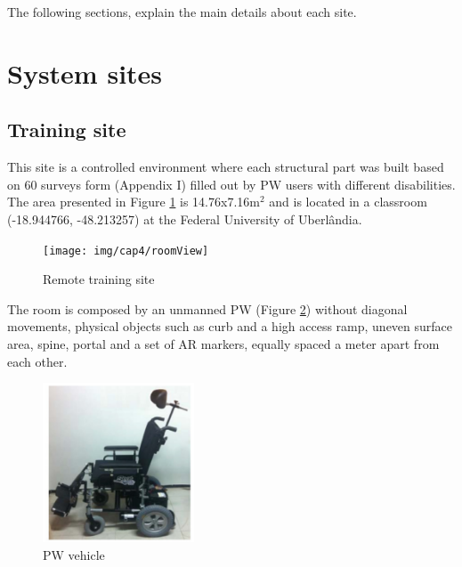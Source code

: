 The following sections, explain the main details about each site.

\section{System sites}

\subsection{Training site}

This site is a controlled environment where each structural part was built based on 60 surveys form (Appendix I) filled out by PW users with different disabilities. The area presented in Figure \ref{fig:roomView} is 14.76x7.16m$^{2}$ and is located in a classroom (-18.944766, -48.213257) at the Federal University of Uberlândia. 


\begin{figure}[!hbt]
\begin{center}
\texttt{[image: img/cap4/roomView]}
\caption{Remote training site} 
\label{fig:roomView} 
\end{center}
\vspace{-20pt}
\end{figure}


The room is composed by an unmanned PW (Figure \ref{fig:wheel-smbsm2}) without diagonal movements, physical objects such as curb and a high access ramp, uneven surface area, spine, portal and a set of AR markers,  equally spaced a meter apart from each other. 

\begin{figure}[!hbt]
\begin{center}
\includegraphics[width=0.4\textwidth]{img/cap4/wheel-smbsm2}
\caption{PW vehicle}
\label{fig:wheel-smbsm2}
\end{center}
\vspace{-20pt}
\end{figure}

